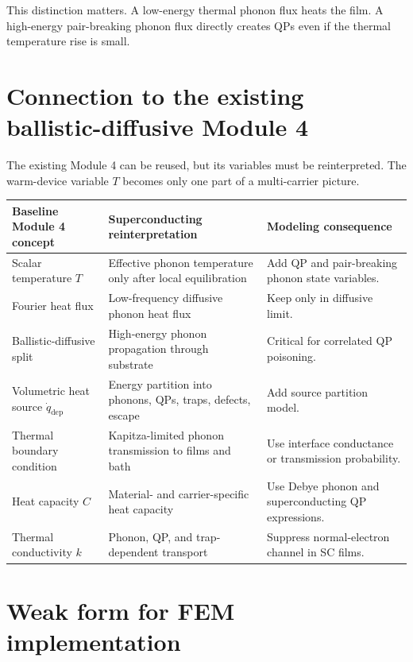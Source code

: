 \documentclass[11pt]{article}
\newcommand{\qdep}{\dot q_{\mathrm{dep}}}
\begin{document}
This distinction matters. A low-energy thermal phonon flux heats the film. A high-energy pair-breaking phonon flux directly creates QPs even if the thermal temperature rise is small.

\section{Connection to the existing ballistic-diffusive Module 4}

The existing Module 4 can be reused, but its variables must be reinterpreted. The warm-device variable \(T\) becomes only one part of a multi-carrier picture.

\begin{center}
\begin{tabularx}{0.96\textwidth}{>{\RaggedRight\arraybackslash}p{}>{\RaggedRight\arraybackslash}p{}>{\RaggedRight\arraybackslash}X}
\toprule
Baseline Module 4 concept & Superconducting reinterpretation & Modeling consequence \\
\midrule
Scalar temperature \(T\) & Effective phonon temperature only after local equilibration & Add QP and pair-breaking phonon state variables. \\
Fourier heat flux & Low-frequency diffusive phonon heat flux & Keep only in diffusive limit. \\
Ballistic-diffusive split & High-energy phonon propagation through substrate & Critical for correlated QP poisoning. \\
Volumetric heat source \(\qdep\) & Energy partition into phonons, QPs, traps, defects, escape & Add source partition model. \\
Thermal boundary condition & Kapitza-limited phonon transmission to films and bath & Use interface conductance or transmission probability. \\
Heat capacity \(C\) & Material- and carrier-specific heat capacity & Use Debye phonon and superconducting QP expressions. \\
Thermal conductivity \(k\) & Phonon, QP, and trap-dependent transport & Suppress normal-electron channel in SC films. \\
\bottomrule
\end{tabularx}
\end{center}

\section{Weak form for FEM implementation}
\end{document}
